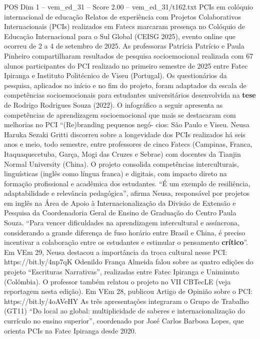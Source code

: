 \begin{textsample}{POS Dim 1 – vem\_ed\_31 – Score 2.00 – vem\_ed\_31/t162.txt}  \label{ex:f1_pos_010}
PCIs em colóquio internacional de educação Relatos de experiência com Projetos Colaborativos Internacionais (PCIs) realizados em Fatecs marcaram presença no Colóquio de Educação Internacional para o Sul Global (CEISG 2025), evento online que ocorreu de 2 a 4 de setembro de 2025.
As professoras Patrícia Patrício e Paula Pinheiro compartilharam resultados de pesquisa socioemocional realizada com 67 alunos participantes do PCI realizado no primeiro semestre de 2025 entre Fatec Ipiranga e Instituto Politécnico de Viseu (Portugal).
Os questionários da pesquisa, aplicados no início e no fim do projeto, foram adaptados da escala de competências socioemocionais para estudantes universitários desenvolvida na \textbf{tese} de Rodrigo Rodrigues Souza (2022).
O infográfico a seguir apresenta as competências de aprendizagem socioemocional que mais se destacaram com melhorias no PCI “(Re)branding pequenos negó- cios: São Paulo e Viseu.
Neusa Haruka Sezaki Gritti discorreu sobre a longevidade dos PCIs realizados há seis anos e meio, todo semestre, entre professores de cinco Fatecs (Campinas, Franca, Itaquaquecetuba, Garça, Mogi das Cruzes e Sebrae) com docentes da Tianjin Normal University (China).
O projeto consolida competências interculturais, linguísticas (inglês como língua franca) e digitais, com impacto direto na formação profissional e acadêmica dos estudantes. “É um exemplo de resiliência, adaptabilidade e relevância pedagógica”, afirma Neusa, responsável por projetos em inglês na Área de Apoio à Internacionalização da Divisão de Extensão e Pesquisa da Coordenadoria Geral de Ensino de Graduação do Centro Paula Souza. “Para vencer dificuldades na aprendizagem intercultural e assíncrona, considerando a grande diferença de fuso horário entre Brasil e China, é preciso incentivar a colaboração entre os estudantes e estimular o pensamento \textbf{crítico}”.
Em VEm 29, Neusa destacou a importância da troca cultural nesse PCI: https://bit.ly/4np7qK Odenildo França Almeida falou sobre as quatro edições do projeto “Escrituras Narrativas”, realizadas entre Fatec Ipiranga e Uniminuto (Colômbia).
O professor também relatou o projeto no VII CBTecLE (veja reportagem nesta edição).
Em VEm 28, publicou Artigo de Opinião sobre o PCI: https://bit.ly/4oAVeHY As três apresentações integraram o Grupo de Trabalho (GT11) “Do local ao global: multiplicidade de saberes e internacionalização do currículo no ensino superior”, coordenado por José Carlos Barbosa Lopes, que orienta PCIs na Fatec Ipiranga desde 2020.

\end{textsample}
